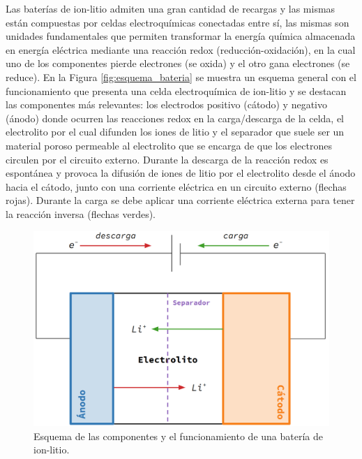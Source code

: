 Las baterías de ion-litio admiten una gran cantidad de recargas y las mismas están 
compuestas por celdas electroquímicas conectadas entre sí, las mismas son unidades 
fundamentales que permiten transformar la energía química almacenada en energía
eléctrica mediante una reacción redox (reducción-oxidación), en la cual uno de los 
componentes pierde electrones (se oxida) y el otro gana electrones (se reduce).
En la Figura \ref{fig:esquema_bateria} se muestra un esquema general con el 
funcionamiento que presenta una celda electroquímica de ion-litio y se destacan 
las componentes más relevantes: los electrodos positivo (cátodo) y negativo (ánodo) 
donde ocurren las reacciones redox en la carga/descarga de la celda, el electrolito 
por el cual difunden los iones de litio y el separador que suele ser un material 
poroso permeable al electrolito que se encarga de que los electrones circulen por 
el circuito externo. Durante la descarga de la reacción redox es espontánea y 
provoca la difusión de iones de litio por el electrolito desde el ánodo hacia el 
cátodo, junto con una corriente eléctrica en un circuito externo (flechas rojas). 
Durante la carga se debe aplicar una corriente eléctrica externa para tener la 
reacción inversa (flechas verdes).
\begin{figure}[h!]
    \centering
    \includegraphics[width=.8\textwidth]{Introduccion/baterias/esquema_bateria.png}
    \caption{Esquema de las componentes y el funcionamiento de una batería de 
    ion-litio.}
    \label{fig:esquema-bateria}
\end{figure}


